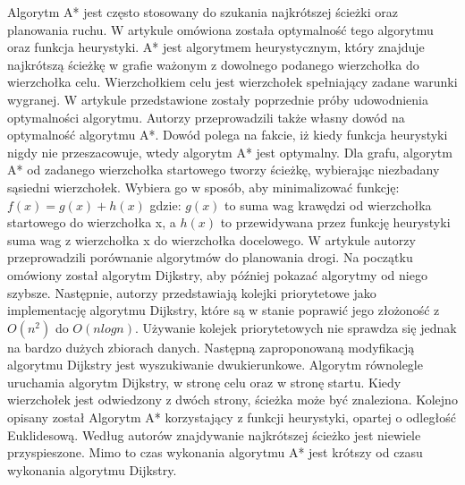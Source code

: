 \indent
Algorytm A* jest często stosowany do szukania najkrótszej ścieżki oraz planowania ruchu. W artykule \cite{dechter1985generalized} omówiona została optymalność tego algorytmu oraz funkcja heurystyki. A* jest algorytmem heurystycznym, który znajduje najkrótszą ścieżkę w grafie ważonym z dowolnego podanego wierzchołka do wierzchołka celu. Wierzchołkiem celu jest wierzchołek spełniający zadane warunki wygranej. W artykule przedstawione zostały poprzednie próby udowodnienia optymalności algorytmu. Autorzy przeprowadzili także własny dowód na optymalność algorytmu A*. Dowód polega na fakcie, iż kiedy funkcja heurystyki nigdy nie przeszacowuje, wtedy algorytm A* jest optymalny. Dla grafu, algorytm A* od zadanego wierzchołka startowego tworzy ścieżkę, wybierając niezbadany sąsiedni wierzchołek. Wybiera go w sposób, aby minimalizować funkcję:
\newline
\newline
\begin{math} f(x) = g(x) + h(x)\end{math}
\newline
\newline
gdzie:
\newline
\newline
\begin{math} g(x) \end{math} to suma wag krawędzi od wierzchołka startowego do wierzchołka x, a
\begin{math} h(x) \end{math} to przewidywana przez funkcję heurystyki suma wag z wierzchołka x do wierzchołka docelowego.
\newline
\indent
W artykule \cite{delling2009engineering} autorzy przeprowadzili porównanie algorytmów do planowania drogi. Na początku omówiony został algorytm Dijkstry, aby później pokazać algorytmy od niego szybsze. Następnie, autorzy przedstawiają kolejki priorytetowe jako implementację algorytmu Dijkstry, które są w stanie poprawić jego złożoność z \begin{math} O(n^2) \end{math} do \begin{math} O(nlogn) \end{math}. Używanie kolejek priorytetowych nie sprawdza się jednak na bardzo dużych zbiorach danych. Następną zaproponowaną modyfikacją algorytmu Dijkstry jest wyszukiwanie dwukierunkowe. Algorytm równolegle uruchamia algorytm Dijkstry, w stronę celu oraz w stronę startu. Kiedy wierzchołek jest odwiedzony z dwóch strony, ścieżka może być znaleziona. Kolejno opisany został Algorytm A* korzystający z funkcji heurystyki, opartej o odległość Euklidesową. Według autorów znajdywanie najkrótszej ścieżko jest niewiele przyspieszone. Mimo to czas wykonania algorytmu A* jest krótszy od czasu wykonania algorytmu Dijkstry.
